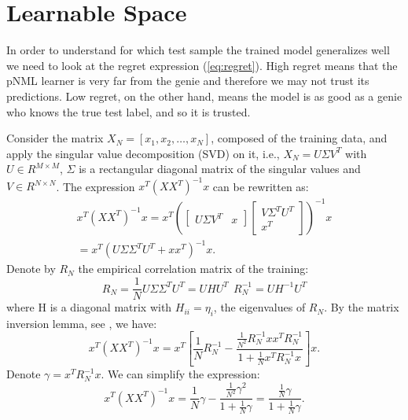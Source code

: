 \documentclass[conference,letterpaper]{IEEEtran}
\begin{document}
\section{Learnable Space} \label{sec:learnable_space}
In order to understand for which test sample the trained model generalizes well we need to look at the regret expression (\ref{eq:regret}). High regret means that the pNML learner is very far from the genie and therefore we may not trust its predictions. Low regret, on the other hand, means the model is as good as a genie who knows the true test label, and so it is trusted.

Consider the matrix $X_N = [x_1,x_2, \hdots, x_{N}]$, composed of the training data, and apply the singular value decomposition (SVD) on it, i.e., $X_N = U \Sigma V^T$ with $U\in R^{M \times M}$, 
$\Sigma$ is a rectangular diagonal matrix of the singular values and $V \in R^{N \times N}$. 
The expression $x^T(XX^T)^{-1}x$ can be rewritten as:
\begin{multline}
x^T(XX^T)^{-1}x = 
x^T\left(\begin{bmatrix} U \Sigma V^T & x \end{bmatrix}
\begin{bmatrix}
V \Sigma^T U^T \\ x^T
\end{bmatrix}
\right)^{-1}x \\
=  x^T\left(U \Sigma \Sigma^T U^T + x x^T\right)^{-1}x.
\end{multline}
Denote by $R_N$ the empirical correlation matrix of the training: 
\begin{equation}
R_N=\frac{1}{N} U \Sigma \Sigma^T U^T=U H U^T \ \ R_N^{-1}=  U H^{-1} U^T   
\end{equation}
where H is a diagonal matrix with $H_{ii}=\eta_i$, the eigenvalues of $R_N$.
By the matrix inversion lemma, see \cite{press2007section}, 
we have:
\begin{equation}
x^T(XX^T)^{-1}x = 
x^T \left[ \frac{1}{N}R_N^{-1} -  \frac{\frac{1}{N^2}R_N^{-1} x x^T  R_N^{-1}}{1 + \frac{1}{N} x^T  R_N^{-1} x} \right] x.
\end{equation}
Denote $\gamma = x^T R_N^{-1} x$. We can simplify the expression:
\begin{equation}
x^T(XX^T)^{-1}x = \frac{1}{N}\gamma - \frac{\frac{1}{N^2}\gamma^2}{1+\frac{1}{N}\gamma} = \frac{\frac{1}{N}\gamma}{1+\frac{1}{N}\gamma}.
\end{equation}
\end{document}

